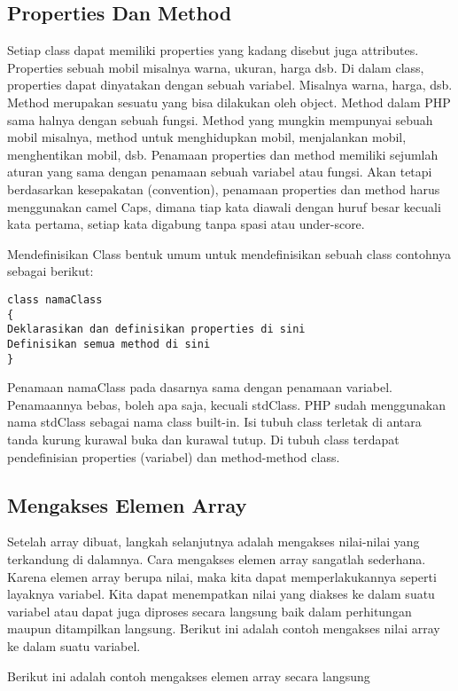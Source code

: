 \subsection{Properties Dan Method}
Setiap class dapat memiliki properties yang kadang disebut juga attributes. Properties sebuah mobil misalnya warna, ukuran, harga dsb. Di dalam class, properties dapat dinyatakan dengan sebuah variabel. Misalnya warna, harga, dsb. Method merupakan sesuatu yang bisa dilakukan oleh object. Method dalam PHP sama halnya dengan sebuah fungsi. Method yang mungkin mempunyai
sebuah mobil misalnya, method untuk menghidupkan mobil, menjalankan mobil, menghentikan mobil, dsb. Penamaan properties dan method memiliki sejumlah aturan yang sama dengan penamaan sebuah variabel atau fungsi. Akan tetapi berdasarkan kesepakatan
(convention), penamaan properties dan method harus menggunakan camel Caps, dimana tiap kata diawali dengan huruf besar kecuali kata pertama, setiap kata digabung tanpa spasi atau under-score.
\par
Mendefinisikan Class bentuk umum untuk mendefinisikan sebuah class contohnya sebagai berikut:
\begin{lstlisting}
class namaClass
{
Deklarasikan dan definisikan properties di sini
Definisikan semua method di sini
} 
\end{lstlisting}

Penamaan namaClass pada dasarnya sama dengan penamaan variabel. Penamaannya bebas, boleh apa saja, kecuali stdClass. PHP sudah menggunakan nama stdClass sebagai nama class built-in. Isi tubuh class terletak di antara tanda kurung kurawal buka  dan kurawal tutup. Di tubuh class terdapat pendefinisian properties (variabel) dan method-method class. 


\subsection{Mengakses Elemen Array}
Setelah array dibuat, langkah selanjutnya adalah mengakses nilai-nilai yang terkandung di dalamnya.
Cara mengakses elemen array sangatlah sederhana. Karena elemen array berupa nilai, maka kita dapat
memperlakukannya seperti layaknya variabel.
Kita dapat menempatkan nilai yang diakses ke dalam suatu variabel atau dapat juga diproses secara
langsung baik dalam perhitungan maupun ditampilkan langsung.
Berikut ini adalah contoh mengakses nilai array ke dalam suatu variabel.


Berikut ini adalah contoh mengakses elemen array secara langsung

